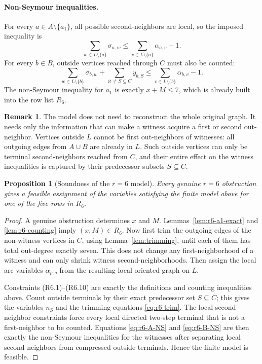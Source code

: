 \documentclass[a4paper,fleqn]{cas-sc}
\newtheorem{proposition}[theorem]{Proposition}
\theoremstyle{definition}
\newtheorem{remark}[theorem]{Remark}
\begin{document}
\paragraph{Non-Seymour inequalities.}
For every $a\in A\setminus\{a_1\}$, all possible second-neighbors are local, so the imposed inequality is
\begin{equation}\label{eq:r6-A-NS}
\sum_{w\in L\setminus\{a\}}\sigma_{a,w}
\le
\sum_{v\in L\setminus\{a\}}\alpha_{a,v}-1.
\end{equation}
For every $b\in B$, outside vertices reached through $C$ must also be counted:
\begin{equation}\label{eq:r6-B-NS}
\sum_{w\in L\setminus\{b\}}\sigma_{b,w}
+
\sum_{\varnothing\ne S\subseteq C}y_{b,S}
\le
\sum_{v\in L\setminus\{b\}}\alpha_{b,v}-1.
\end{equation}
The non-Seymour inequality for $a_1$ is exactly $x+M\le 7$, which is already built into the row list $R_6$.
\begin{remark}
    The model does not need to reconstruct the whole original graph. It needs only the information that can make a witness acquire a first or second out-neighbor. Vertices outside $L$ cannot be first out-neighbors of witnesses: all outgoing edges from $A\cup B$ are already in $L$. Such outside vertices can only be terminal second-neighbors reached from $C$, and their entire effect on the witness inequalities is captured by their predecessor subsets $S\subseteq C$.
\end{remark}

\begin{proposition}[Soundness of the $r=6$ model]\label{prop:r6-sound}
Every genuine $r=6$ obstruction gives a feasible assignment of the variables satisfying the finite model above for one of the five rows in $R_6$.
\end{proposition}
\begin{proof}
A genuine obstruction determines $x$ and $M$.  Lemmas~\ref{lem:r6-a1-exact} and \ref{lem:r6-counting} imply $(x,M)\in R_6$.  Now first trim the outgoing edges of the non-witness vertices in $C$, using Lemma~\ref{lem:trimming}, until each of them has total out-degree exactly seven.  This does not change any first-neighborhood of a witness and can only shrink witness second-neighborhoods.  Then assign the local arc variables $\alpha_{p,q}$ from the resulting local oriented graph on $L$.

Constraints (R6.1)--(R6.10) are exactly the definitions and counting inequalities above.  Count outside terminals by their exact predecessor set $S\subseteq C$; this gives the variables $n_S$ and the trimming equations \eqref{eq:r6-trim}.  The local second-neighbor constraints force every local directed two-step terminal that is not a first-neighbor to be counted.  Equations \eqref{eq:r6-A-NS} and \eqref{eq:r6-B-NS} are then exactly the non-Seymour inequalities for the witnesses after separating local second-neighbors from compressed outside terminals.  Hence the finite model is feasible.
\end{proof}
\end{document}
